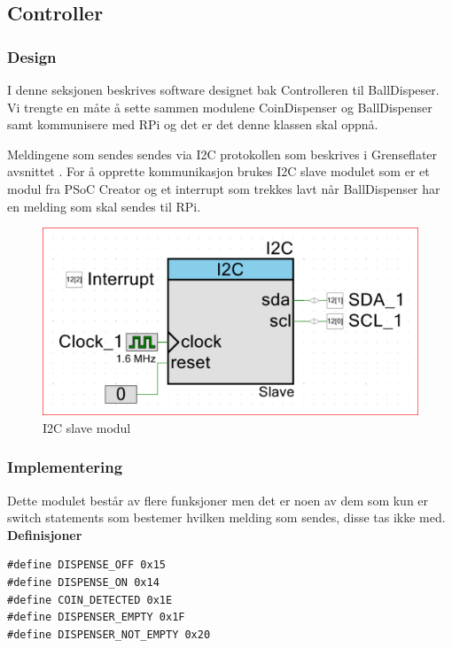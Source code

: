 \documentclass[Softwaredesign/Softwaredesign_main.tex]{subfiles}
\begin{document}
\subsection{Controller} \label{sec:BallDispController}
\subsubsection{Design}
I denne seksjonen beskrives software designet bak Controlleren til BallDispeser. Vi trengte en måte å sette sammen modulene CoinDispenser og BallDispenser samt kommunisere med RPi og det er det denne klassen skal oppnå. 


Meldingene som sendes sendes via I2C protokollen som beskrives i Grenseflater avsnittet . For å opprette kommunikasjon brukes I2C slave modulet som er et modul fra PSoC Creator og et interrupt som trekkes lavt når BallDispenser har en melding som skal sendes til RPi.
\begin{figure}[H]
    \centering
    \includegraphics[width=\textwidth]{Rapport/BallDispenser/ballDispenserController/graphics/I2Cslave.png}
    \caption{I2C slave modul}
    \label{fig:I2CSlaveBallDisp}
\end{figure}
\subsubsection{Implementering}
Dette modulet består av flere funksjoner men det er noen av dem som kun er switch statements som bestemer hvilken melding som sendes, disse tas ikke med.\\
{\textbf{Definisjoner}}\\
\begin{lstlisting}[caption={Defininisjoner BallDispenser Controller},style=customc,label={lst:dispenserControlFunction}]
#define DISPENSE_OFF 0x15
#define DISPENSE_ON 0x14
#define COIN_DETECTED 0x1E
#define DISPENSER_EMPTY 0x1F
#define DISPENSER_NOT_EMPTY 0x20
\end{lstlisting}
\end{document}
